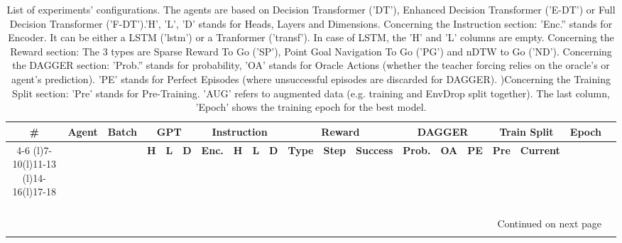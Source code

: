 \begin{longtable}{@{\hskip3pt}c@{\hskip3pt}c@{\hskip3pt}c@{\hskip3pt}c@{\hskip3pt}c@{\hskip3pt}c@{\hskip3pt}c@{\hskip3pt}c@{\hskip3pt}c@{\hskip3pt}c@{\hskip3pt}c@{\hskip3pt}c@{\hskip3pt}c@{\hskip3pt}c@{\hskip3pt}c@{\hskip3pt}c@{\hskip3pt}c@{\hskip3pt}c@{\hskip3pt}c@{\hskip3pt}c}
\caption{List of experiments' configurations. \newline The agents are based on Decision Transformer ('DT'), Enhanced Decision Transformer ('E-DT') or Full Decision Transformer ('F-DT').\newline 'H', 'L', 'D' stands for Heads, Layers and Dimensions. \newline Concerning the Instruction section: 'Enc.'' stands for Encoder. It can be either a LSTM ('lstm') or a Tranformer ('transf'). In case of LSTM, the 'H' and 'L' columns are empty. \newline Concerning the Reward section: The 3 types are Sparse Reward To Go ('SP'), Point Goal Navigation To Go ('PG') and nDTW to Go ('ND'). \newline Concerning the DAGGER section: 'Prob.'' stands for probability, 'OA' stands for Oracle Actions (whether the teacher forcing relies on the oracle's or agent's prediction). 'PE' stands for Perfect Episodes (where unsuccessful episodes are discarded for DAGGER). )\newline Concerning the Training Split section: 'Pre' stands for Pre-Training. 'AUG' refers to augmented data (e.g. training and EnvDrop split together). The last column, 'Epoch' shows the training epoch for the best model.}\\
\toprule
\textbf{\#} & \textbf{Agent} & \textbf{Batch} & \multicolumn{3}{c}{\textbf{GPT}} & \multicolumn{4}{c}{\textbf{Instruction}} & \multicolumn{3}{c}{\textbf{Reward}} & \multicolumn{3}{c}{\textbf{DAGGER}} & \multicolumn{2}{c}{\textbf{Train Split}} & \textbf{Epoch} \\
\cmidrule(l){4-6} \cmidrule(l){7-10}\cmidrule(l){11-13} \cmidrule(l){14-16}\cmidrule(l){17-18} \textbf{~} &     \textbf{~} &     \textbf{~} &   \textbf{H} & \textbf{L} & \textbf{D} &        \textbf{Enc.} & \textbf{H} & \textbf{L} & \textbf{D} &   \textbf{Type} & \textbf{Step} & \textbf{Success} &  \textbf{Prob.} & \textbf{OA} & \textbf{PE} &         \textbf{Pre} & \textbf{Current} &     \textbf{~} \\
\midrule
\endhead
\midrule
\multicolumn{19}{r}{{Continued on next page}} \\
\midrule
\endfoot


\end{longtable}
